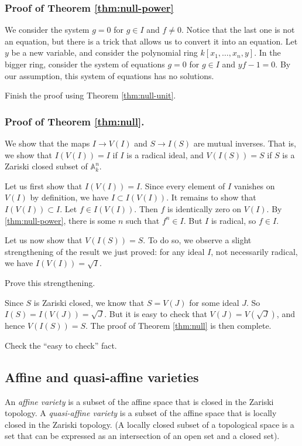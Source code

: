 \documentclass[11pt]{article}
\begin{document}
\subsubsection{Proof of Theorem \ref{thm:null-power}}
\label{sec:orge56a6e9}
We consider the system \(g = 0\) for \(g \in I\) and \(f \neq 0\).
Notice that the last one is not an equation, but there is a trick that allows us to convert it into an equation.
Let \(y\) be a new variable, and consider the polynomial ring \(k[x_1,\dots,x_n,y]\).
In the bigger ring, consider the system of equations \(g = 0\) for \(g \in I\) and \(yf - 1 = 0\).
By our assumption, this system of equations has no solutions.
\begin{skipped}
Finish the proof using Theorem \ref{thm:null-unit}.
\end{skipped}

\subsubsection{Proof of Theorem \ref{thm:null}.}
\label{sec:orgaa5ed98}
We show that the maps \(I \to V(I)\) and \(S \to I(S)\) are mutual inverses.
That is, we show that \(I(V(I)) = I\) if \(I\) is a radical ideal, and \(V(I(S)) = S\) if \(S\) is a Zariski closed subset of \(\mathbb A^n_k\).

Let us first show that \(I(V(I)) = I\).
Since every element of \(I\) vanishes on \(V(I)\) by definition, we have \(I \subset I(V(I))\).
It remains to show that \(I(V(I)) \subset I\).
Let \(f \in I(V(I))\).
Then \(f\) is identically zero on \(V(I)\).
By \ref{thm:null-power}, there is some \(n\) such that \(f^n \in I\).
But \(I\) is radical, so \(f \in I\).

Let us now show that \(V(I(S)) = S\).
To do so, we observe a slight strengthening of the result we just proved: for any ideal \(I\), not necessarily radical, we have \(I(V(I)) = \sqrt{I}\). 
\begin{skipped}
Prove this strengthening.
\end{skipped}
Since \(S\) is Zariski closed, we know that \(S = V(J)\) for some ideal \(J\).
So \(I(S) = I(V(J)) = \sqrt{J}.\)
But it is easy to check that \(V(J) = V(\sqrt{J})\), and hence \(V(I(S)) = S\).
The proof of Theorem \ref{thm:null} is then complete.
\begin{skipped}
Check the ``easy to check'' fact.
\end{skipped}

\subsection{Affine and quasi-affine varieties}
\label{sec:org5880d3f}
An \emph{affine variety} is a subset of the affine space that is closed in the Zariski topology.
A \emph{quasi-affine variety} is a subset of the affine space that is locally closed in the Zariski topology.
(A locally closed subset of a topological space is a set that can be expressed as an intersection of an open set and a closed set).
\end{document}
